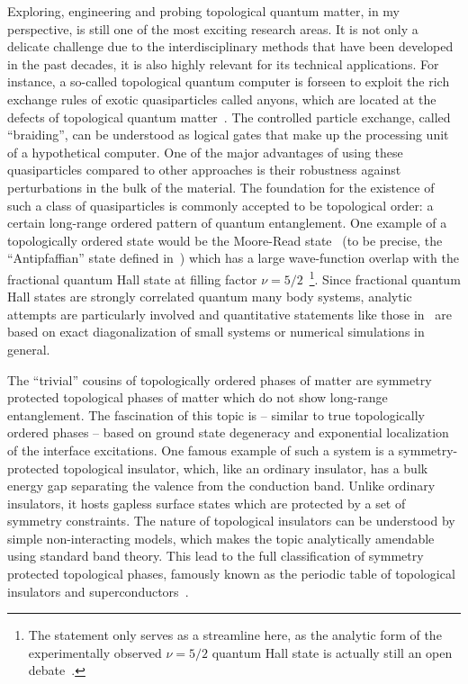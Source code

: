 Exploring, engineering and probing topological quantum matter, in my perspective, is still one of the most exciting research areas.
It is not only a delicate challenge due to the interdisciplinary methods that have been developed in the past decades, it is also highly relevant for its technical applications.
For instance, a so-called topological quantum computer is forseen to exploit the rich exchange rules of exotic quasiparticles called anyons, which are located at the defects of topological quantum matter~\cite{Freedman2002}.
The controlled particle exchange, called ``braiding'', can be understood as logical gates that make up the processing unit of a hypothetical computer.
One of the major advantages of using these quasiparticles compared to other approaches is their robustness against perturbations in the bulk of the material.
The foundation for the existence of such a class of quasiparticles is commonly accepted to be topological order: a certain long-range ordered pattern of quantum entanglement.
One example of a topologically ordered state would be the Moore-Read state~\cite{Moore1991,Read1996} (to be precise, the ``Antipfaffian'' state defined in~\cite{Levin2007,Lee2007}) which has a large wave-function overlap with the fractional quantum Hall state at filling factor $\nu=5/2$~\cite{Storni2010,Rezayi2017}\footnote{The statement only serves as a streamline here, as the analytic form of the experimentally observed $\nu=5/2$ quantum Hall state is actually still an open debate~\cite{Simon2020}.}.
Since fractional quantum Hall states are strongly correlated quantum many body systems, analytic attempts are particularly involved and quantitative statements like those in~\cite{Storni2010} are based on exact diagonalization of small systems or numerical simulations in general.

The ``trivial'' cousins of topologically ordered phases of matter are symmetry protected topological phases of matter which do not show long-range entanglement.
The fascination of this topic is -- similar to true topologically ordered phases -- based on ground state degeneracy and exponential localization of the interface excitations.
One famous example of such a system is a symmetry-protected topological insulator, which, like an ordinary insulator, has a bulk energy gap separating the valence from the conduction band.
Unlike ordinary insulators, it hosts gapless surface states which are protected by a set of symmetry constraints.
The nature of topological insulators can be understood by simple non-interacting models, which makes the topic analytically amendable using standard band theory.
This lead to the full classification of symmetry protected topological phases, famously known as the periodic table of topological insulators and superconductors~\cite{Altland1997,Kitaev2009}.

